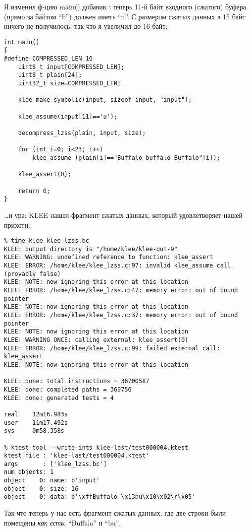 Я изменил ф-цию main() добавив : теперь 11-й байт входного (сжатого) буфера (прямо за байтом ``b'') должен
иметь ``u''.
С размером сжатых данных в 15 байт ничего не получилось, так что я увеличил до 16 байт:

\begin{lstlisting}
int main()
{
#define COMPRESSED_LEN 16
	uint8_t input[COMPRESSED_LEN];
	uint8_t plain[24];
	uint32_t size=COMPRESSED_LEN;
  
	klee_make_symbolic(input, sizeof input, "input");
	
	klee_assume(input[11]=='u');
	
	decompress_lzss(plain, input, size);

	for (int i=0; i<23; i++)
		klee_assume (plain[i]=="Buffalo buffalo Buffalo"[i]);

	klee_assert(0);
	
	return 0;
}
\end{lstlisting}

\dots и ура: KLEE нашел фрагмент сжатых данных, который удовлетворяет нашей прихоти:

\begin{lstlisting}
% time klee klee_lzss.bc
KLEE: output directory is "/home/klee/klee-out-9"
KLEE: WARNING: undefined reference to function: klee_assert
KLEE: ERROR: /home/klee/klee_lzss.c:97: invalid klee_assume call (provably false)
KLEE: NOTE: now ignoring this error at this location
KLEE: ERROR: /home/klee/klee_lzss.c:47: memory error: out of bound pointer
KLEE: NOTE: now ignoring this error at this location
KLEE: ERROR: /home/klee/klee_lzss.c:37: memory error: out of bound pointer
KLEE: NOTE: now ignoring this error at this location
KLEE: WARNING ONCE: calling external: klee_assert(0)
KLEE: ERROR: /home/klee/klee_lzss.c:99: failed external call: klee_assert
KLEE: NOTE: now ignoring this error at this location

KLEE: done: total instructions = 36700587
KLEE: done: completed paths = 369756
KLEE: done: generated tests = 4

real    12m16.983s
user    11m17.492s
sys     0m58.358s

% ktest-tool --write-ints klee-last/test000004.ktest
ktest file : 'klee-last/test000004.ktest'
args       : ['klee_lzss.bc']
num objects: 1
object    0: name: b'input'
object    0: size: 16
object    0: data: b'\xffBuffalo \x13bu\x10\x02\r\x05'
\end{lstlisting}

Так что теперь у нас есть фрагмент сжатых данных, где две строки были помещены \textit{как есть}: ``Buffalo'' и ``bu''.

